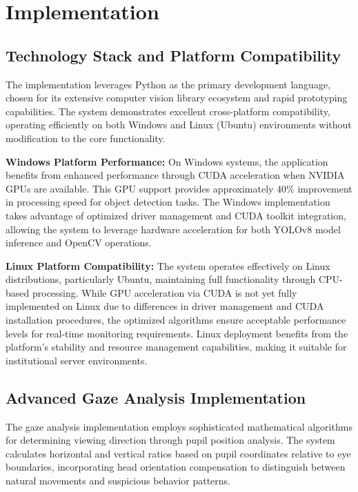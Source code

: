 \documentclass[conference]{IEEEtran}
\begin{document}
\section{Implementation}

\subsection{Technology Stack and Platform Compatibility}

The implementation leverages Python as the primary development language, chosen for its extensive computer vision library ecosystem and rapid prototyping capabilities. The system demonstrates excellent cross-platform compatibility, operating efficiently on both Windows and Linux (Ubuntu) environments without modification to the core functionality.

\textbf{Windows Platform Performance:} On Windows systems, the application benefits from enhanced performance through CUDA acceleration when NVIDIA GPUs are available. This GPU support provides approximately 40\% improvement in processing speed for object detection tasks. The Windows implementation takes advantage of optimized driver management and CUDA toolkit integration, allowing the system to leverage hardware acceleration for both YOLOv8 model inference and OpenCV operations.

\textbf{Linux Platform Compatibility:} The system operates effectively on Linux distributions, particularly Ubuntu, maintaining full functionality through CPU-based processing. While GPU acceleration via CUDA is not yet fully implemented on Linux due to differences in driver management and CUDA installation procedures, the optimized algorithms ensure acceptable performance levels for real-time monitoring requirements. Linux deployment benefits from the platform's stability and resource management capabilities, making it suitable for institutional server environments.

\subsection{Advanced Gaze Analysis Implementation}

The gaze analysis implementation employs sophisticated mathematical algorithms for determining viewing direction through pupil position analysis. The system calculates horizontal and vertical ratios based on pupil coordinates relative to eye boundaries, incorporating head orientation compensation to distinguish between natural movements and suspicious behavior patterns.
\end{document}

